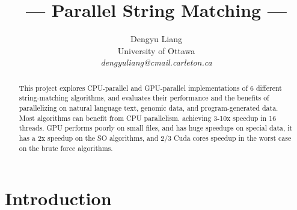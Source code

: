 \documentclass[11pt]{article}       %
\begin{document}


\title{--- Parallel String Matching ---}


\author{
Dengyu Liang\\
University of Ottawa\\
{\em dengyuliang@cmail.carleton.ca}
} %

\maketitle

\begin{abstract}
This project explores CPU-parallel and GPU-parallel implementations of 6 different string-matching algorithms, and evaluates their performance and the benefits of parallelizing on natural language text, genomic data, and program-generated data. Most algorithms can benefit from CPU parallelism. achieving 3-10x speedup in 16 threads. GPU performs poorly on small files, and has huge speedups on special data, it has a 2x speedup on the SO algorithms, and 2/3 Cuda cores speedup in the worst case on the brute force algorithms.

\end{abstract}


\section{Introduction} \label{intro}
\end{document}
